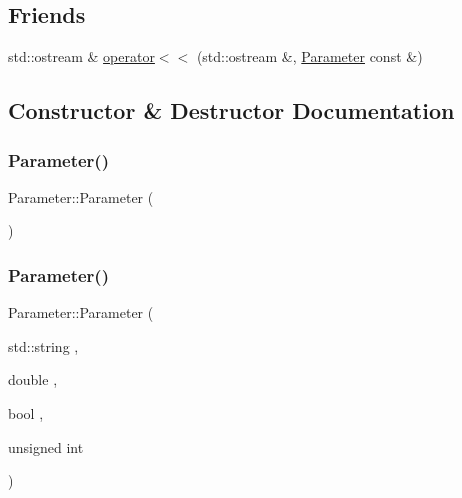 \subsection*{Friends}
\begin{DoxyCompactItemize}
\item 
std\+::ostream \& \mbox{\hyperlink{class_parameter_a062fa105b64c362071304bc5f2eb350a}{operator$<$$<$}} (std\+::ostream \&, \mbox{\hyperlink{class_parameter}{Parameter}} const \&)
\end{DoxyCompactItemize}


\subsection{Constructor \& Destructor Documentation}
\mbox{\label{class_parameter_a5ba93ca36c3261d3850e67f92717c2f5}} 
\subsubsection{\texorpdfstring{Parameter()}{Parameter()}\hspace{0.1cm}{\footnotesize\ttfamily [1/3]}}
{\footnotesize\ttfamily Parameter\+::\+Parameter (\begin{DoxyParamCaption}{ }\end{DoxyParamCaption})}

\mbox{\label{class_parameter_a1d0a0e3024d6cdac044398afbff979e3}} 
\subsubsection{\texorpdfstring{Parameter()}{Parameter()}\hspace{0.1cm}{\footnotesize\ttfamily [2/3]}}
{\footnotesize\ttfamily Parameter\+::\+Parameter (\begin{DoxyParamCaption}\item[{std\+::string}]{,  }\item[{double}]{,  }\item[{bool}]{,  }\item[{unsigned}]{int }\end{DoxyParamCaption})}

\mbox{\label{class_parameter_ad3f5d861da24673d97bd1bd206b0b89a}} 
